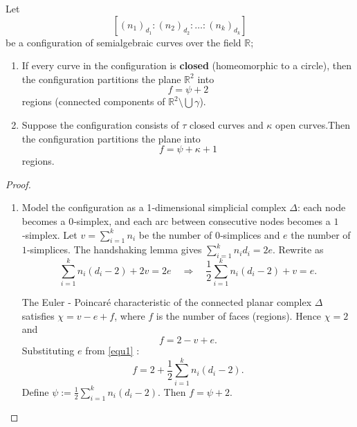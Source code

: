 \documentclass[article,11pt]{amsart} \numberwithin{equation}{section}
\numberwithin{equation}{section}
\begin{document}
{\begin{thm}
	Let 
	\[
	[(n_1)_{d_1} : (n_2)_{d_2} : \dots : (n_k)_{d_k}]
	\]
	be a configuration of semialgebraic curves over the field $\mathbb{R}$;
	
	\begin{enumerate}
		\item[(i)] If every curve in the configuration is \textbf{closed} (homeomorphic to a circle), then the configuration partitions the plane $\mathbb{R}^2$ into 
		\[
		f = \psi + 2
		\]
		regions (connected components of $\mathbb{R}^2 \setminus \bigcup \mathcal{\gamma}$).
		
		\item[(ii)] Suppose the configuration consists of $\tau$ closed curves and $\kappa$ open curves.Then the configuration partitions the plane into 
		\[
		f = \psi + \kappa + 1
		\]
		regions.
	\end{enumerate}
\end{thm}

\begin{proof}
	\begin{enumerate}
		\item[(i)]Model the configuration as a 1‑dimensional simplicial complex $\Delta$: each node becomes a $0$‑simplex, and each arc between consecutive nodes becomes a $1$‑simplex.  
		Let $v = \sum_{i=1}^{k} n_i$ be the number of $0$‑simplices and $e$ the number of $1$‑simplices.  
		The handshaking lemma gives $\sum_{i=1}^{k} n_i d_i = 2e$.  
		Rewrite as
		\begin{equation}\label{equ1}
			\sum_{i=1}^{k} n_i(d_i-2) + 2v = 2e
			\quad\Longrightarrow\quad
			\frac{1}{2}\sum_{i=1}^{k} n_i(d_i-2) + v = e.
		\end{equation}
		
		The Euler - Poincaré characteristic of the connected planar complex $\Delta$ satisfies $ \chi=v - e + f $, where $f$ is the number of faces (regions). Hence $\chi=2$ and
		\[
		f = 2 - v + e.
		\]
		Substituting $e$ from \ref{equ1} :
		\[
		f = 2 + \frac{1}{2}\sum_{i=1}^{k} n_i(d_i-2).
		\]
		Define $\psi := \frac{1}{2}\sum_{i=1}^{k} n_i(d_i-2)$. Then $f = \psi + 2$.
		

\end{enumerate}
\end{proof}}
\end{document}
